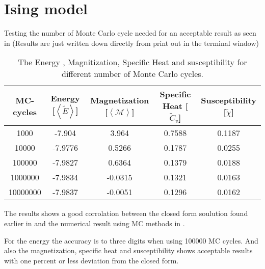 \section{Ising model}
Testing the number of Monte Carlo cycle needed for an acceptable result as seen in  (Results are just written down directly from print out in the terminal window)

\begin{table}[H] 
\centering
\caption{The Energy , Magnitization, Specific Heat and susceptibility for different number of Monte Carlo cycles.}
\begin{center}
\begin{tabular}{|c|c|c|c|c|}
\hline
MC-cycles & Energy [$\left< \tilde{E} \right>$] & Magnetization [$\left< \mathcal{M} \right>$] & Specific Heat [$\tilde{C}_v $]& Susceptibility [$\tilde{\chi}$] \\
\hline
1000 & -7.904 & 3.964 & 0.7588 & 0.1187 \\
10000 & -7.9776 & 0.5266 & 0.1787 & 0.0255 \\
100000 & -7.9827 & 0.6364 & 0.1379 & 0.0188\\
1000000 & -7.9834 & -0.0315 & 0.1321 & 0.0163 \\
10000000 & -7.9837 & -0.0051 & 0.1296 & 0.0162 \\
\hline 

\end{tabular}
\end{center}
\label{tab:MCising}
\end{table}

The results shows a good corrolation between the closed form soulution found earlier in  and the numerical result using MC methods in . 

For the energy the accuracy is to three digits when using 100000 MC cycles. And also the magnetization, specific heat and susceptibility shows acceptable results with one percent or less deviation from the closed form. 
 